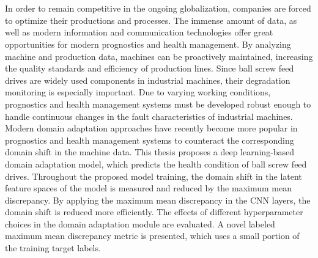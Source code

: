 \chapter{\abstractname}

In order to remain competitive in the ongoing globalization, companies are forced to optimize their productions and processes. The immense amount of data, as well as modern information and communication technologies offer great opportunities for modern prognostics and health management. By analyzing machine and production data, machines can be proactively maintained, increasing the quality standards and efficiency of production lines. Since ball screw feed drives are widely used components in industrial machines, their degradation monitoring is especially important. Due to varying working conditions, prognostics and health management systems must be developed robust enough to handle continuous changes in the fault characteristics of industrial machines. Modern domain adaptation approaches have recently become more popular in prognostics and health management systems to counteract the corresponding domain shift in the machine data. This thesis proposes a deep learning-based domain adaptation model, which predicts the health condition of ball screw feed drives. Throughout the proposed model training, the domain shift in the latent feature spaces of the model is measured and reduced by the maximum mean discrepancy. By applying the maximum mean discrepancy in the CNN layers, the domain shift is reduced more efficiently. The effects of different hyperparameter choices in the domain adaptation module are evaluated. A novel labeled maximum mean discrepancy metric is presented, which uses a small portion of the training target labels. 


\makeatletter
{}
{\renewcommand{\abstractname}{Kurzfassung}}
{\renewcommand{\abstractname}{Abstract}}
\makeatother

\chapter{\abstractname}

